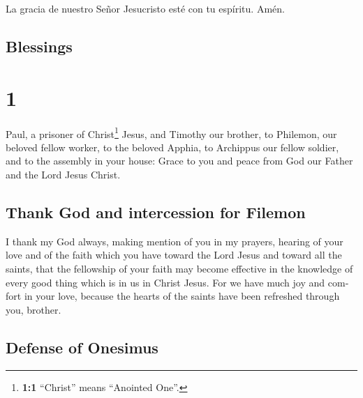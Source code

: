 \begin{paracol}{2}
 La gracia de nuestro Señor Jesucristo esté con tu
espíritu. Amén. \switchcolumn \begin{otherlanguage}{english}

\hypertarget{blessings}{%
\subsection{Blessings}\label{blessings}}

\hypertarget{section-1}{%
\section{1}\label{section-1}}

 Paul, a prisoner of Christ\footnote{\textbf{1:1}
  ``Christ'' means ``Anointed One''.} Jesus, and Timothy our brother, to
Philemon, our beloved fellow worker,  to the beloved
Apphia, to Archippus our fellow soldier, and to the assembly in your
house:  Grace to you and peace from God our Father and the
Lord Jesus Christ.

\hypertarget{thank-god-and-intercession-for-filemon}{%
\subsection{Thank God and intercession for
Filemon}\label{thank-god-and-intercession-for-filemon}}

 I thank my God always, making mention of you in my
prayers,  hearing of your love and of the faith which you
have toward the Lord Jesus and toward all the saints, 
that the fellowship of your faith may become effective in the knowledge
of every good thing which is in us in Christ Jesus.  For
we have much joy and comfort in your love, because the hearts of the
saints have been refreshed through you, brother.

\hypertarget{defense-of-onesimus}{%
\subsection{Defense of Onesimus}\label{defense-of-onesimus}}


\end{otherlanguage}
\end{paracol}
